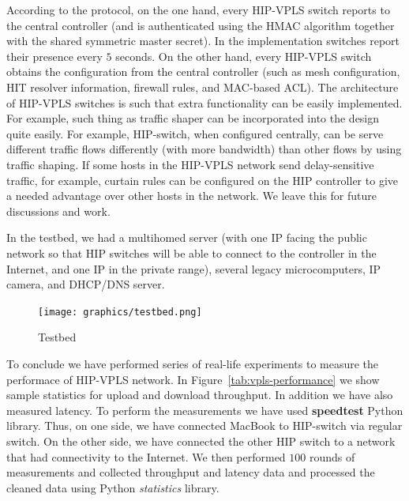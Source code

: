 

According to the protocol, on the one hand, every HIP-VPLS 
switch reports to the central controller (and is authenticated 
using the HMAC algorithm together with the shared symmetric 
master secret). In the implementation switches report their presence every $5$ 
seconds. On the other hand, every HIP-VPLS switch obtains 
the configuration from the central controller (such as mesh 
configuration, HIT resolver information, firewall rules, and 
MAC-based ACL). The architecture of HIP-VPLS switches is such
that extra functionality can be easily implemented. For example,
such thing as traffic shaper can be incorporated into the design
quite easily. For example, HIP-switch, when configured centrally, 
can be serve different traffic flows differently (with more bandwidth) than other 
flows by using traffic shaping. If some hosts in the HIP-VPLS network send delay-sensitive traffic, 
for example, curtain rules can be configured on the HIP controller 
to give a needed advantage over other hosts in the network. We 
leave this for future discussions and work.

In the testbed, we had a multihomed server (with one IP facing 
the public network so that HIP switches will be able to connect to 
the controller in the Internet, and one IP in the private range), 
several legacy microcomputers, IP camera, and DHCP/DNS server.

\begin{figure}[h!]
    \centering
    \texttt{[image: graphics/testbed.png]}
    \caption{Testbed}
    \label{fig:testbed}
\end{figure}

To conclude we have performed series of real-life experiments to measure the 
performace of HIP-VPLS network. In Figure~\ref{tab:vpls-performance} we show
sample statistics for upload and download throughput. In addition we have also
measured latency. To perform the measurements we have used {\bf speedtest}
Python library. Thus, on one side, we have connected MacBook to HIP-switch via regular
switch. On the other side, we have connected the other HIP switch to a network 
that had connectivity to the Internet. We then performed $100$ rounds of measurements
and collected throughput and latency data and processed the cleaned data using Python
{\it statistics} library.

